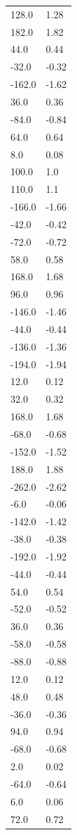 \begin{longtable}{ll}
128.0 & 1.28 \\
182.0 & 1.82 \\
44.0 & 0.44 \\
-32.0 & -0.32 \\
-162.0 & -1.62 \\
36.0 & 0.36 \\
-84.0 & -0.84 \\
64.0 & 0.64 \\
8.0 & 0.08 \\
100.0 & 1.0 \\
110.0 & 1.1 \\
-166.0 & -1.66 \\
-42.0 & -0.42 \\
-72.0 & -0.72 \\
58.0 & 0.58 \\
168.0 & 1.68 \\
96.0 & 0.96 \\
-146.0 & -1.46 \\
-44.0 & -0.44 \\
-136.0 & -1.36 \\
-194.0 & -1.94 \\
12.0 & 0.12 \\
32.0 & 0.32 \\
168.0 & 1.68 \\
-68.0 & -0.68 \\
-152.0 & -1.52 \\
188.0 & 1.88 \\
-262.0 & -2.62 \\
-6.0 & -0.06 \\
-142.0 & -1.42 \\
-38.0 & -0.38 \\
-192.0 & -1.92 \\
-44.0 & -0.44 \\
54.0 & 0.54 \\
-52.0 & -0.52 \\
36.0 & 0.36 \\
-58.0 & -0.58 \\
-88.0 & -0.88 \\
12.0 & 0.12 \\
48.0 & 0.48 \\
-36.0 & -0.36 \\
94.0 & 0.94 \\
-68.0 & -0.68 \\
2.0 & 0.02 \\
-64.0 & -0.64 \\
6.0 & 0.06 \\
72.0 & 0.72 \\

\end{longtable}
